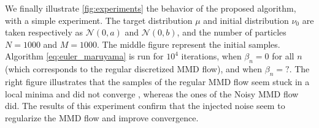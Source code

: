 We finally illustrate \ref{fig:experiments} the behavior of the proposed algorithm, with a simple experiment. The target distribution $\mu$ and initial distribution $\nu_0$ are taken respectively as $\mathcal{N}(0,a)$ and $\mathcal{N}(0,b)$, and the number of particles $N=1000$ and $M=1000$. The middle figure represent the initial samples. Algorithm \eqref{eq:euler_maruyama} is run for $10^4$ iterations, when $\beta_n=0$ for all $n$ (which corresponds to the regular discretized MMD flow), and when $\beta_n=?$. The right figure illustrates that the samples of the regular MMD flow seem stuck in a local minima and did not converge , whereas the ones of the Noisy MMD flow did. The results of this experiment confirm that the injected noise seem to regularize the MMD flow and improve convergence.









